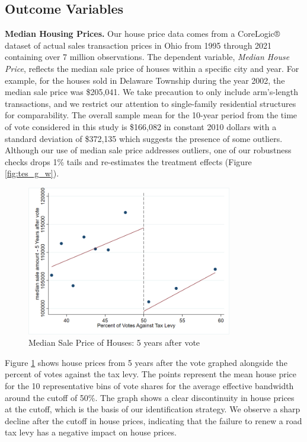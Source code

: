 \subsection{Outcome Variables}

{\bf Median Housing Prices.} Our house price data comes from a CoreLogic® dataset of actual sales transaction prices in Ohio from 1995 through 2021 containing over 7 million observations. The dependent variable, \textit{Median House Price}, reflects the median sale price of houses within a specific city and year. For example, for the houses sold in Delaware Township during the year 2002, the median sale price was \$205,041. We take precaution to only include arm’s-length transactions, and we restrict our attention to single-family residential structures for comparability.  The overall sample mean for the 10-year period from the time of vote considered in this study is \$166,082 in constant 2010 dollars with a standard deviation of \$372,135 which suggests the presence of some outliers. Although our use of median sale price addresses outliers, one of our robustness checks drops 1\% tails and re-estimates the treatment effects (Figure \ref{fig:tes_g_w}).  

\begin{figure}[ht]
    \centering
    \includegraphics[width=0.8\textwidth,keepaspectratio]{images/rd_plot_year_5_after_vote.png}
    \caption{Median Sale Price of Houses: 5 years after vote}
    \label{fig:hp_year5_after}
\end{figure}

Figure \ref{fig:hp_year5_after} shows house prices from 5 years after the vote graphed alongside the percent of votes against the tax levy. The points represent the mean house price for the 10 representative bins of vote shares for the average effective bandwidth around the cutoff of 50\%. The graph shows a clear discontinuity in house prices at the cutoff, which is the basis of our identification strategy. We observe a sharp decline after the cutoff in house prices, indicating that the failure to renew a road tax levy has a negative impact on house prices.


